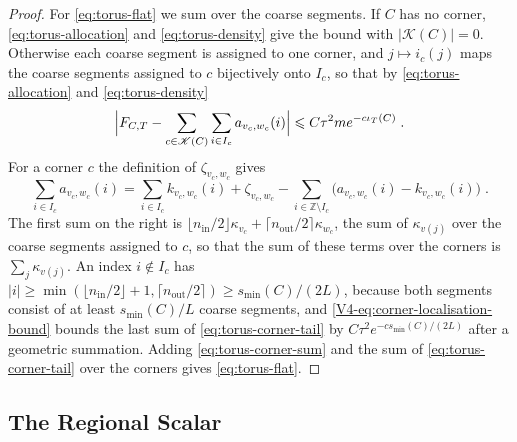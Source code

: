 \documentclass[11pt]{article}
\numberwithin{equation}{section}
\theoremstyle{remark}
\theoremstyle{plain}
\begin{document}
\begin{proof}
For \eqref{eq:torus-flat} we sum over the coarse segments. If $C$ has no corner, \eqref{eq:torus-allocation} and \eqref{eq:torus-density} give the bound with $|\mathscr K(C)|=0$. Otherwise each coarse segment is assigned to one corner, and $j\mapsto i_c(j)$ maps the coarse segments assigned to $c$ bijectively onto $I_c$, so that by \eqref{eq:torus-allocation} and \eqref{eq:torus-density}
\begin{equation}\label{eq:torus-corner-sum}
    \Bigl| F_{C,T}-\sum_{c\in\mathscr K(C)}\sum_{i\in I_c}a_{v_c,w_c}(i)\Bigr|\leqslant C\tau^2me^{-c\iota_T(C)}\;.
\end{equation}
For a corner $c$ the definition of $\zeta_{v_c,w_c}$ gives
\begin{equation}\label{eq:torus-corner-tail}
    \sum_{i\in I_c}a_{v_c,w_c}(i)=\sum_{i\in I_c}k_{v_c,w_c}(i)+\zeta_{v_c,w_c}-\sum_{i\in\mathbb Z\setminus I_c}\bigl(a_{v_c,w_c}(i)-k_{v_c,w_c}(i)\bigr)\;.
\end{equation}
The first sum on the right is $\lfloor n_{\mathrm{in}}/2\rfloor\kappa_{v_c}+\lceil n_{\mathrm{out}}/2\rceil\kappa_{w_c}$, the sum of $\kappa_{v(j)}$ over the coarse segments assigned to $c$, so that the sum of these terms over the corners is $\sum_j\kappa_{v(j)}$. An index $i\notin I_c$ has $| i|\geqslant \min(\lfloor n_{\mathrm{in}}/2\rfloor+1,\lceil n_{\mathrm{out}}/2\rceil)\geqslant s_{\min}(C)/(2L)$, because both segments consist of at least $s_{\min}(C)/L$ coarse segments, and \eqref{V4-eq:corner-localisation-bound} bounds the last sum of \eqref{eq:torus-corner-tail} by $C\tau^2e^{-cs_{\min}(C)/(2L)}$ after a geometric summation. Adding \eqref{eq:torus-corner-sum} and the sum of \eqref{eq:torus-corner-tail} over the corners gives \eqref{eq:torus-flat}.
\end{proof}

\subsection{The Regional Scalar}\label{sec:torus-regional}
\end{document}
